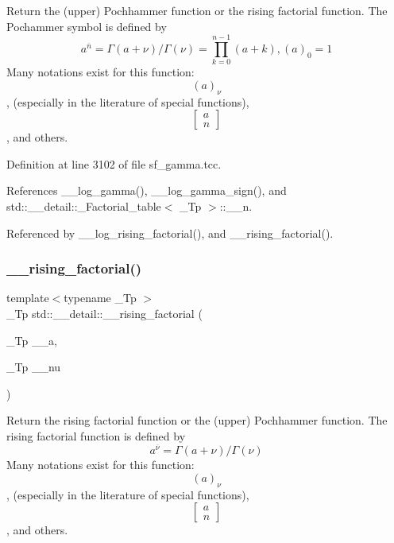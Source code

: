 Return the (upper) Pochhammer function or the rising factorial function. The Pochammer symbol is defined by \[ a^{\overline{n}} = \Gamma(a + \nu) / \Gamma(\nu) = \prod_{k=0}^{n-1} (a + k), (a)_0 = 1 \] Many notations exist for this function\+: \[ (a)_\nu \], (especially in the literature of special functions), \[ \left[ \begin{array}{c} a \\ n \end{array} \right] \], and others. 



Definition at line 3102 of file sf\+\_\+gamma.\+tcc.



References \+\_\+\+\_\+log\+\_\+gamma(), \+\_\+\+\_\+log\+\_\+gamma\+\_\+sign(), and std\+::\+\_\+\+\_\+detail\+::\+\_\+\+Factorial\+\_\+table$<$ \+\_\+\+Tp $>$\+::\+\_\+\+\_\+n.



Referenced by \+\_\+\+\_\+log\+\_\+rising\+\_\+factorial(), and \+\_\+\+\_\+rising\+\_\+factorial().

\mbox{\label{namespacestd_1_1____detail_a109a13aa776d60bdc49b1cedc0e77670}} 
\subsubsection{\texorpdfstring{\+\_\+\+\_\+rising\+\_\+factorial()}{\_\_rising\_factorial()}\hspace{0.1cm}{\footnotesize\ttfamily [2/2]}}
{\footnotesize\ttfamily template$<$typename \+\_\+\+Tp $>$ \\
\+\_\+\+Tp std\+::\+\_\+\+\_\+detail\+::\+\_\+\+\_\+rising\+\_\+factorial (\begin{DoxyParamCaption}\item[{\+\_\+\+Tp}]{\+\_\+\+\_\+a,  }\item[{\+\_\+\+Tp}]{\+\_\+\+\_\+nu }\end{DoxyParamCaption})}



Return the rising factorial function or the (upper) Pochhammer function. The rising factorial function is defined by \[ a^{\overline{\nu}} = \Gamma(a + \nu) / \Gamma(\nu) \] Many notations exist for this function\+: \[ (a)_\nu \], (especially in the literature of special functions), \[ \left[ \begin{array}{c} a \\ n \end{array} \right] \], and others. 



